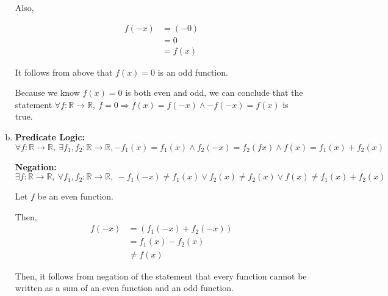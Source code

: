 \documentclass[12pt]{article}
\begin{document}
\begin{enumerate}[a.]
    \bigbreak

    Also,

    \begin{align}
        f(-x) &= (-0)\\
        &= 0\\
        &= f(x)
    \end{align}

    It follows from above that $f(x) = 0$ is an odd function.

    \bigbreak

    Because we know $f(x) = 0$ is both even and odd, we can conclude that the statement
    $\forall f: \mathbb{R} \to \mathbb{R},\:f = 0 \Rightarrow f(x) = f(-x) \land -f(-x)
    = f(x)$ is true.

    \item

    \textbf{Predicate Logic:} $\forall f:\mathbb{R} \to \mathbb{R},\:\exists f_1,
    f_2: \mathbb{R} \to \mathbb{R}, -f_1(x) = f_1(x) \land f_2(-x) = f_2(fx)
    \land f(x) = f_1(x) + f_2(x)$

    \bigskip

    \textbf{Negation:} $\exists f: \mathbb{R} \to \mathbb{R},\:\forall f_1,f_2:
    \mathbb{R} \to \mathbb{R},\:-f_1(-x) \neq f_1(x) \lor f_2(x) \neq f_2(x) \lor
    f(x) \neq f_1(x) + f_2(x)$

    \bigskip

    Let $f$ be an even function.

    \bigskip

    Then,
    \setcounter{equation}{0}
    \begin{align}
        f(-x) &= (f_1(-x) + f_2(-x))\\
        &= f_1(x) - f_2(x)\\
        &\neq f(x)
    \end{align}

    \bigskip

    Then, it follows from negation of the statement that every function cannot be
    written as a sum of an even function and an odd function.


\end{enumerate}
\end{document}
